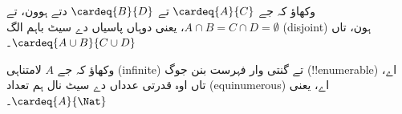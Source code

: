 \documentclass[../../../include/open-logic-section]{subfiles}
\begin{document}
\begin{prob}
وکھاؤ کہ جے $\cardeq{A}{C}$ تے $\cardeq{B}{D}$ دتے ہوون، تے
$A \cap B = C \cap D = \emptyset$، یعنی دوہاں پاسیاں دے سیٹ باہم
الگ (disjoint) ہون، تاں $\cardeq{A \cup B}{C \cup D}$۔
\end{prob}

\begin{prob}
وکھاؤ کہ جے $A$ لامتناہی (infinite) تے گنتی وار فہرست بنن جوگ
(!!{enumerable}) اے، تاں اوہ قدرتی عدداں دے سیٹ نال ہم تعداد
(equinumerous) اے، یعنی $\cardeq{A}{\Nat}$۔
\end{prob}
\end{document}
